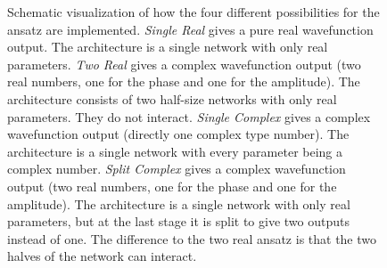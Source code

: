 

\begin{figure}[htbp]
    \centering
    \caption{
        Schematic visualization of how the four different possibilities for the ansatz are implemented.
        \emph{Single Real} gives a pure real wavefunction output. The architecture is a single network with only real parameters.
        \emph{Two Real} gives a complex wavefunction output (two real numbers, one for the phase and one for the amplitude). The architecture consists of two half-size networks with only real parameters. They do not interact.
        \emph{Single Complex} gives a complex wavefunction output (directly one complex type number). The architecture is a single network with every parameter being a complex number.
        \emph{Split Complex} gives a complex wavefunction output (two real numbers, one for the phase and one for the amplitude). The architecture is a single network with only real parameters, but at the last stage it is split to give two outputs instead of one. The difference to the two real ansatz is that the two \glqq halves\grqq{} of the network can interact.
    }
    \label{fig:ansatz-comparisons}
\end{figure}